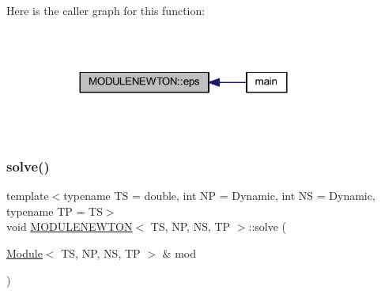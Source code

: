 Here is the caller graph for this function\+:
\nopagebreak
\begin{figure}[H]
\begin{center}
\leavevmode
\includegraphics[width=276pt]{class_m_o_d_u_l_e_n_e_w_t_o_n_a2df80239a016b8216c167bfe026e76b4_icgraph}
\end{center}
\end{figure}
\mbox{\label{class_m_o_d_u_l_e_n_e_w_t_o_n_a8c3da4880abb18ae9e99854c21335e20}} 
\subsubsection{\texorpdfstring{solve()}{solve()}}
{\footnotesize\ttfamily template$<$typename TS = double, int NP = Dynamic, int NS = Dynamic, typename TP = TS$>$ \\
void \mbox{\hyperlink{class_m_o_d_u_l_e_n_e_w_t_o_n}{M\+O\+D\+U\+L\+E\+N\+E\+W\+T\+ON}}$<$ TS, NP, NS, TP $>$\+::solve (\begin{DoxyParamCaption}\item[{\mbox{\hyperlink{class_module}{Module}}$<$ TS, NP, NS, TP $>$ \&}]{mod }\end{DoxyParamCaption})\hspace{0.3cm}{\ttfamily [inline]}}

